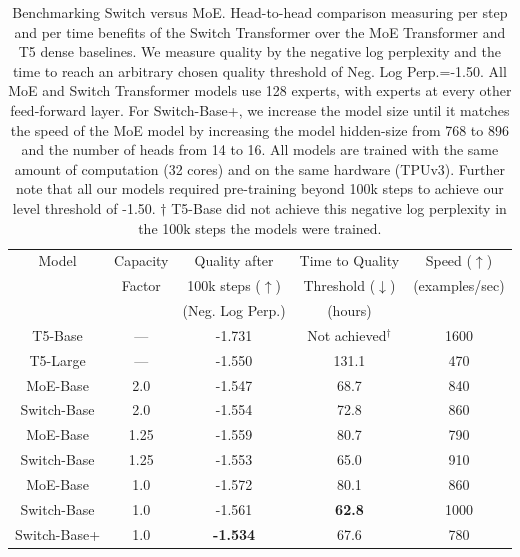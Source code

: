 \documentclass[twoside,11pt]{article}
\begin{document}
\begin{table}[!th]
\centering
\begin{tabular}{ccccc}
    \toprule
    Model & Capacity & Quality after & Time to Quality & Speed ($\uparrow$) \\ 
      & Factor & 100k steps ($\uparrow$) & Threshold ($\downarrow$) & (examples/sec) \\
      &  & (Neg. Log Perp.) & (hours) &  \\ \hline
    T5-Base & --- & -1.731 & Not achieved$^\dag$ & 1600 \\%
    T5-Large & --- & -1.550 & 131.1 & 470 \\ 
    \hline
    MoE-Base & 2.0 & -1.547 & 68.7 & 840 \\ 
    Switch-Base & 2.0 & -1.554 & 72.8 & 860 \\
    \hline
    MoE-Base & 1.25 & -1.559 & 80.7 & 790 \\%
    Switch-Base & 1.25 & -1.553 & 65.0 & 910 \\%
    \hline
    MoE-Base & 1.0 & -1.572 & 80.1 & 860 \\%
    Switch-Base & 1.0 & -1.561 & \textbf{62.8} & 1000 \\ 
    Switch-Base+ & 1.0 & \textbf{-1.534} & 67.6 & 780 \\
    \bottomrule
\end{tabular}
\caption{Benchmarking Switch versus MoE. Head-to-head comparison measuring per step and per time benefits of the Switch Transformer over the MoE Transformer and T5 dense baselines. We measure quality by the negative log perplexity and the time to reach an arbitrary chosen quality threshold of Neg. Log Perp.=-1.50. All MoE and Switch Transformer models use 128 experts, with experts at every other feed-forward layer. For Switch-Base+, we increase the model size until it matches the speed of the MoE model by increasing the model hidden-size from 768 to 896 and the number of heads from 14 to 16. All models are trained with the same amount of computation (32 cores) and on the same hardware (TPUv3). Further note that all our models required pre-training beyond 100k steps to achieve our level threshold of -1.50. $\dag$ T5-Base did not achieve this negative log perplexity in the 100k steps the models were trained.}
\label{tab:top1_vs_moe}
\end{table}
\end{document}
